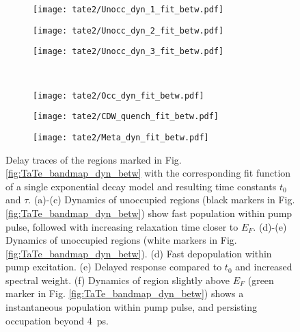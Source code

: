 \begin{figure}[t]
	\centering
	\begin{subfigure}[b]{0.33\textwidth}
		\texttt{[image: tate2/Unocc\_dyn\_1\_fit\_betw.pdf]}
		\caption{}
	\end{subfigure}
	\hfill
	\begin{subfigure}[b]{0.33\textwidth}
		\texttt{[image: tate2/Unocc\_dyn\_2\_fit\_betw.pdf]}
		\caption{}
	\end{subfigure}
	\hfill
	\begin{subfigure}[b]{0.33\textwidth}
		\texttt{[image: tate2/Unocc\_dyn\_3\_fit\_betw.pdf]}
		\caption{}
	\end{subfigure}
	\\
	\begin{subfigure}[b]{0.33\textwidth}
		\texttt{[image: tate2/Occ\_dyn\_fit\_betw.pdf]}
		\caption{}
	\end{subfigure}
	\hfill
	\begin{subfigure}[b]{0.33\textwidth}
		\texttt{[image: tate2/CDW\_quench\_fit\_betw.pdf]}
		\caption{}
	\end{subfigure}
	\hfill
	\begin{subfigure}[b]{0.33\textwidth}
		\texttt{[image: tate2/Meta\_dyn\_fit\_betw.pdf]}
		\caption{}
	\end{subfigure}
	\caption{Delay traces of the regions marked in Fig. \ref{fig:TaTe_bandmap_dyn_betw} with the corresponding fit function of a single exponential decay model and resulting time constants $t_0$ and $\tau$. (a)-(c) Dynamics of unoccupied regions (black markers in Fig. \ref{fig:TaTe_bandmap_dyn_betw}) show fast population within pump pulse, followed with increasing relaxation time closer to $E_F$. (d)-(e) Dynamics of unoccupied regions (white markers in Fig. \ref{fig:TaTe_bandmap_dyn_betw}). (d) Fast depopulation within pump excitation. (e) Delayed response compared to $t_0$ and increased spectral weight. (f) Dynamics of region slightly above $E_F$ (green marker in Fig. \ref{fig:TaTe_bandmap_dyn_betw}) shows a instantaneous population within pump pulse, and persisting occupation beyond \qty{4}{\pico\second}.}
	\label{fig:TaTe_dyn_betw}
\end{figure}

